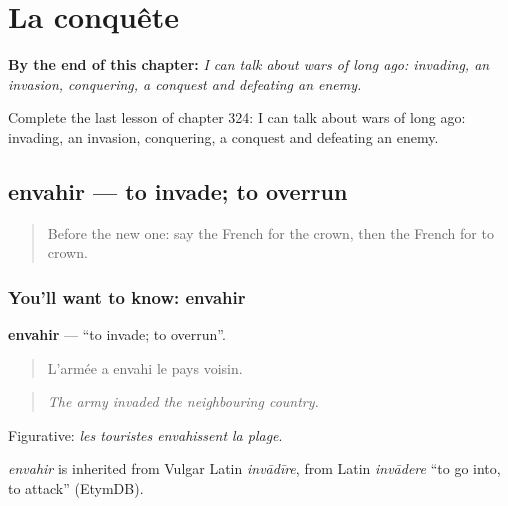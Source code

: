 
\chapter{La conquête}
\label{ch:fr-la-conquete}

\begin{chapteropening}
\textbf{By the end of this chapter:} \emph{I can talk about wars of long ago: invading, an invasion, conquering, a conquest and defeating an enemy.}

Complete the last lesson of chapter 324: I can talk about wars of long ago: invading, an invasion, conquering, a conquest and defeating an enemy.
\end{chapteropening}

\section[envahir]{envahir — to invade; to overrun}

\label{lesson:FR-C324-envahir}



\begin{quote}
Before the new one: say the French for the crown, then the French for to crown.
\end{quote}

\subsection*{You'll want to know: envahir}
\textbf{envahir} — \textquotedblleft{}to invade; to overrun\textquotedblright{}.

\begin{quote}
L'armée a envahi le pays voisin.
\end{quote}

\begin{quote}
\emph{The army invaded the neighbouring country.}
\end{quote}

Figurative: \emph{les touristes envahissent la plage}.

\begin{cousinweb}
\emph{envahir} is inherited from Vulgar Latin \emph{invādīre}, from Latin \emph{invādere} \textquotedblleft{}to go into, to attack\textquotedblright{} (EtymDB).
\end{cousinweb}

